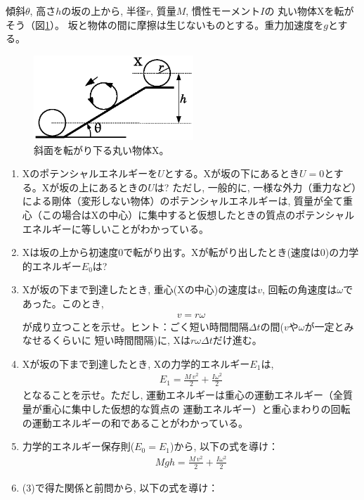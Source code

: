 %
\begin{q}\label{q:mominert_wheel_slope}
傾斜$\theta$, 高さ$h$の坂の上から, 半径$r$, 質量$M$, 慣性モーメント$I$の
丸い物体Xを転がそう（図\ref{fig:slope_wheel}）。
坂と物体の間に摩擦は生じないものとする。重力加速度を$g$とする。
\begin{figure}[h]
    \centering
    \includegraphics[width=6.0cm]{slope_wheel.eps}
    \caption{斜面を転がり下る丸い物体X。}\label{fig:slope_wheel}
\end{figure}\begin{enumerate}
\item Xのポテンシャルエネルギーを$U$とする。Xが坂の下にあるとき$U=0$とする。Xが坂の上にあるときの$U$は?
ただし, 一般的に, 一様な外力（重力など）による剛体（変形しない物体）のポテンシャルエネルギーは, 
質量が全て重心（この場合はXの中心）に集中すると仮想したときの質点のポテンシャルエネルギーに等しいことがわかっている。
\item Xは坂の上から初速度0で転がり出す。Xが転がり出したとき(速度は0)の力学的エネルギー$E_0$は?
\item Xが坂の下まで到達したとき, 重心(Xの中心)の速度は$v$, 回転の角速度は$\omega$であった。このとき, 
\begin{eqnarray}
v=r\omega
\end{eqnarray}
が成り立つことを示せ。ヒント：ごく短い時間間隔$\Delta t$の間($v$や$\omega$が一定とみなせるくらいに
短い時間間隔)に, Xは$r\omega\Delta t$だけ進む。
\vspace{0.1cm}
\item Xが坂の下まで到達したとき, Xの力学的エネルギー$E_1$は, 
\begin{eqnarray}
E_1=\frac{M\,v^2}{2}+\frac{I\omega^2}{2}
\end{eqnarray}
となることを示せ。ただし, 運動エネルギーは重心の運動エネルギー（全質量が重心に集中した仮想的な質点の
運動エネルギー）と重心まわりの回転の運動エネルギーの和であることがわかっている。
\item 力学的エネルギー保存則($E_0=E_1$)から, 以下の式を導け：
\begin{eqnarray}
Mgh=\frac{M\,v^2}{2}+\frac{I\omega^2}{2}
\end{eqnarray}
\item (3)で得た関係と前問から, 以下の式を導け：

\end{enumerate}
\end{q}
